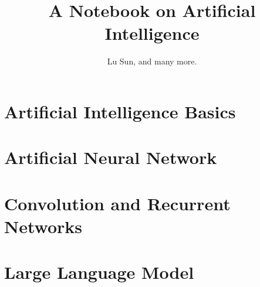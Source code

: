 

\makeindex



\frontmatter

\title{A Notebook on Artificial Intelligence}
\author{Lu Sun, and many more.}

\maketitle


\tableofcontents


\listoffigures
\listoftables

\mainmatter

\part{Artificial Intelligence Basics}









\part{Artificial Neural Network}







\part{Convolution and Recurrent Networks}





\part{Large Language Model}











\appendix






\printindex



